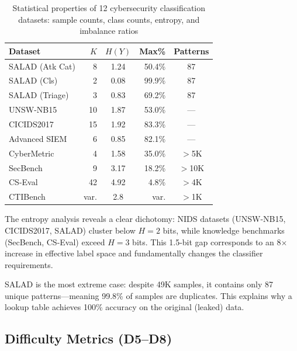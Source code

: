\documentclass[journal]{IEEEtran}
\begin{document}
\begin{table}[!ht]
\centering
\caption{Statistical properties of 12 cybersecurity classification datasets: sample counts, class counts, entropy, and imbalance ratios}
\label{tab:stats}
\begin{tabular}{lrcrc}
\toprule
\textbf{Dataset} & \textbf{$K$} & \textbf{$H(Y)$} & \textbf{Max\%} & \textbf{Patterns} \\
\midrule
SALAD (Atk Cat) & 8 & 1.24 & 50.4\% & 87 \\
SALAD (Cls) & 2 & 0.08 & 99.9\% & 87 \\
SALAD (Triage) & 3 & 0.83 & 69.2\% & 87 \\
UNSW-NB15 & 10 & 1.87 & 53.0\% & --- \\
CICIDS2017 & 15 & 1.92 & 83.3\% & --- \\
Advanced SIEM & 6 & 0.85 & 82.1\% & --- \\
CyberMetric & 4 & 1.58 & 35.0\% & $>$5K \\
SecBench & 9 & 3.17 & 18.2\% & $>$10K \\
CS-Eval & 42 & 4.92 & 4.8\% & $>$4K \\
CTIBench & var. & 2.8 & var. & $>$1K \\
\bottomrule
\end{tabular}
\end{table}

The entropy analysis reveals a clear dichotomy: NIDS datasets (UNSW-NB15, CICIDS2017, SALAD) cluster below $H = 2$ bits, while knowledge benchmarks (SecBench, CS-Eval) exceed $H = 3$ bits. This 1.5-bit gap corresponds to an 8$\times$ increase in effective label space and fundamentally changes the classifier requirements.

SALAD is the most extreme case: despite 49K samples, it contains only 87 unique patterns---meaning 99.8\% of samples are duplicates. This explains why a lookup table achieves 100\% accuracy on the original (leaked) data.

\subsection{Difficulty Metrics (D5--D8)}
\end{document}
